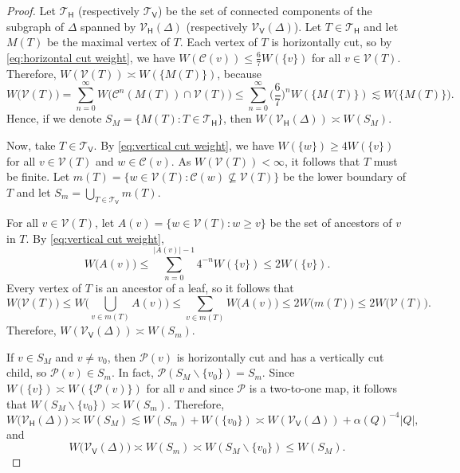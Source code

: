 \documentclass[11pt,reqno]{amsart}
\newcommand{\cC}{\mathcal{C}}
\newcommand{\cP}{\mathcal{P}}
\newcommand{\cT}{\mathcal{T}}
\newcommand{\cV}{\mathcal{V}}
\newcommand{\HH}{\mathsf{H}}
\newcommand{\VV}{\mathsf{V}}
\renewcommand{\approx}{\asymp}
\newcommand{\0}{\mathbf{0}}
\renewcommand{\1}{\mathbf 1}
\renewcommand{\mid}{:}
\renewcommand{\subset}{\subseteq}
\renewcommand{\ge}{\geqslant}
\renewcommand{\le}{\leqslant}
\renewcommand{\setminus}{\smallsetminus}
\theoremstyle{remark}
\newcommand{\cVv}{{\mathcal{V}_{\mathsf{V}}}}
\newcommand{\cVh}{{\mathcal{V}_{\mathsf{H}}}}
\begin{document}
\begin{proof}
  Let $\cT_{\HH}$ (respectively $\cT_{\VV}$) be the set of connected components of the subgraph of $\Delta$ spanned by $\cVh(\Delta)$ (respectively $\cVv(\Delta)$).  Let $T\in \cT_{\HH}$ and let $M(T)$ be the maximal vertex of $T$.  Each vertex of $T$ is horizontally cut, so by \eqref{eq:horizontal cut weight}, we have $W(\cC(v))\le \frac{6}{7}W(\{v\})$ for all $v\in \cV(T)$.  Therefore, $W(\cV(T))\asymp W(\{M(T)\})$, because
  $$W\big(\cV(T)\big)
  =\sum_{n=0}^\infty W\big( \cC^n(M(T))\cap \cV(T)\big)
  \le \sum_{n=0}^\infty \biggl(\frac{6}{7}\biggr)^n W(\{M(T)\})\lesssim W\big(\{M(T)\}\big).$$
  Hence, if we denote  $S_M=\{M(T)\mid T\in \cT_{\HH}\}$, then
  $W(\cVh(\Delta))\asymp W(S_M).$

  Now, take $T\in \cT_{\VV}$.  By \eqref{eq:vertical cut weight}, we have $W(\{w\})\ge 4W(\{v\})$ for all $v\in \cV(T)$ and $w\in \cC(v)$. As  $W(\cV(T))<\infty$, it follows that $T$ must be finite.  Let
  $m(T)=\{w\in \cV(T)\mid \cC(w)\not \subset \cV(T)\}$
  be the lower boundary of $T$ and let $S_m=\bigcup_{T\in \cT_{\VV}}m(T)$.

  For all $v\in \cV(T)$, let $A(v)=\{w\in \cV(T)\mid w\ge v\}$ be the set of ancestors of $v$ in $T$.  By \eqref{eq:vertical cut weight},
  $$
  W\big(A(v)\big) \le \sum_{n=0}^{|A(v)|-1} 4^{-n} W(\{v\})\le  2 W(\{v\}).
  $$
  Every vertex of $T$ is an ancestor of a leaf, so it follows that
  $$W\big(\cV(T)\big)\le W\bigg(\bigcup_{v\in m(T)} A(v)\bigg) \le\sum_{v\in m(T)}   W\big(A(v)\big)\le  2W\big(m(T)\big)\le 2W\big(\cV(T)\big).$$
Therefore,
  $W(\cVv(\Delta))\asymp W(S_m).$

  If $v\in S_M$ and $v\ne v_0$, then $\cP(v)$ is horizontally cut and has a vertically cut child, so $\cP(v)\in S_m$.  In fact, $\cP(S_M\setminus \{v_0\})=S_m$.  Since $W(\{v\})\approx W(\{\cP(v)\})$ for all $v$ and since $\cP$ is a two-to-one map, it follows that $W(S_M\setminus \{v_0\})\asymp W(S_m).$ Therefore,
  $$W\big(\cVh(\Delta)\big)\asymp W(S_M) %
  \lesssim W(S_m) + W(\{v_0\}) \asymp W(\cVv(\Delta)) +\alpha(Q)^{-4}|Q|,$$
  and
  \begin{equation*}
  W\big(\cVv(\Delta)\big)\asymp W(S_m) \asymp W(S_M\setminus \{v_0\}) \le W(S_M).\tag*{\qedhere}
  \end{equation*}
\end{proof}
\end{document}
